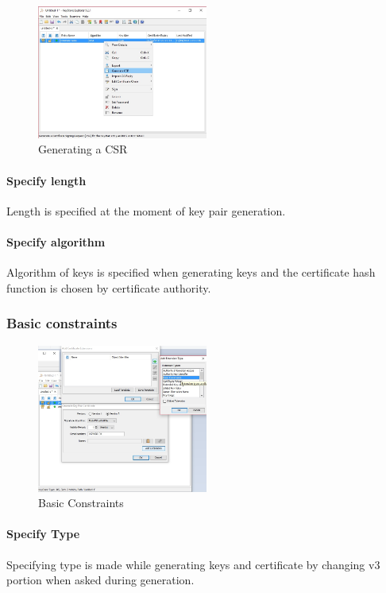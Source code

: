 \documentclass[10pt, a4paper]{report}
\begin{document}
\begin{figure}[!ht]
 \caption{Generating a CSR}
 \centering
  \includegraphics[width=0.5\textwidth]{../Dependancies/Keystore_Explorer/genCSR.jpg}
\end{figure}

      \paragraph{Specify length}
Length is specified at the moment of key pair generation.

      \paragraph{Specify algorithm}
Algorithm of keys is specified when generating keys and the certificate hash function is chosen by certificate authority.

    \subsubsection{Basic constraints}

\begin{figure}[!ht]
 \caption{Basic Constraints}
 \centering
  \includegraphics[width=0.5\textwidth]{../Dependancies/Keystore_Explorer/Basic_Constraints.jpg}
\end{figure}

      \paragraph{Specify Type}
Specifying type is made while generating keys and certificate by changing v3 portion when asked during generation.
\end{document}
